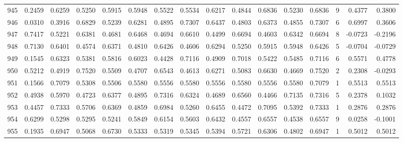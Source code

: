\begin{tabular}{lrrrrrrrrrrrrrrr}
945 &      0.2459 &  0.6259 &  0.5250 &  0.5915 &  0.5948 &  0.5522 &  0.5534 &  0.6217 &  0.4844 &  0.6836 &   0.5230 &     0.6836 &      9 &                    0.4377 &                     0.3800 \\
946 &      0.0310 &  0.3916 &  0.6829 &  0.5239 &  0.6281 &  0.4895 &  0.7307 &  0.6437 &  0.4803 &  0.6373 &   0.4855 &     0.7307 &      6 &                    0.6997 &                     0.3606 \\
947 &      0.7417 &  0.5221 &  0.6381 &  0.4681 &  0.6468 &  0.4694 &  0.6610 &  0.4499 &  0.6694 &  0.4603 &   0.6342 &     0.6694 &      8 &                   -0.0723 &                    -0.2196 \\
948 &      0.7130 &  0.6401 &  0.4574 &  0.6371 &  0.4810 &  0.6426 &  0.4606 &  0.6294 &  0.5250 &  0.5915 &   0.5948 &     0.6426 &      5 &                   -0.0704 &                    -0.0729 \\
949 &      0.1545 &  0.6323 &  0.5381 &  0.5816 &  0.6023 &  0.4428 &  0.7116 &  0.4909 &  0.7018 &  0.5422 &   0.5485 &     0.7116 &      6 &                    0.5571 &                     0.4778 \\
950 &      0.5212 &  0.4919 &  0.7520 &  0.5509 &  0.4707 &  0.6543 &  0.4613 &  0.6271 &  0.5083 &  0.6630 &   0.4669 &     0.7520 &      2 &                    0.2308 &                    -0.0293 \\
951 &      0.1566 &  0.7079 &  0.5308 &  0.5506 &  0.5580 &  0.5556 &  0.5580 &  0.5556 &  0.5580 &  0.5556 &   0.5580 &     0.7079 &      1 &                    0.5513 &                     0.5513 \\
952 &      0.4938 &  0.5970 &  0.4723 &  0.6377 &  0.4895 &  0.7316 &  0.6324 &  0.4689 &  0.6560 &  0.4466 &   0.7135 &     0.7316 &      5 &                    0.2378 &                     0.1032 \\
953 &      0.4457 &  0.7333 &  0.5706 &  0.6369 &  0.4859 &  0.6984 &  0.5260 &  0.6455 &  0.4472 &  0.7095 &   0.5392 &     0.7333 &      1 &                    0.2876 &                     0.2876 \\
954 &      0.6299 &  0.5298 &  0.5295 &  0.5241 &  0.5849 &  0.6154 &  0.5603 &  0.6432 &  0.4557 &  0.6557 &   0.4538 &     0.6557 &      9 &                    0.0258 &                    -0.1001 \\
955 &      0.1935 &  0.6947 &  0.5068 &  0.6730 &  0.5333 &  0.5319 &  0.5345 &  0.5394 &  0.5721 &  0.6306 &   0.4802 &     0.6947 &      1 &                    0.5012 &                     0.5012 \\

\end{tabular}
